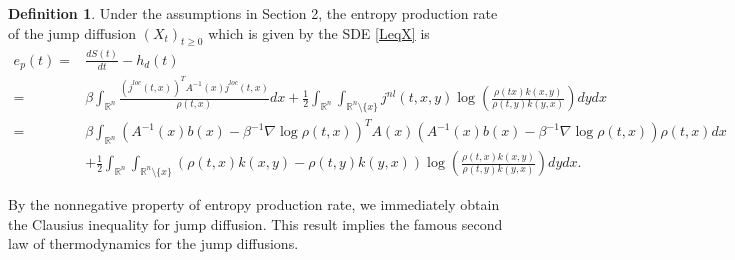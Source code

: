 \documentclass[10pt]{article}
\theoremstyle{definition}
\newtheorem{defn}{Definition}[section]
\theoremstyle{remark}
\numberwithin{equation}{section}
\begin{document}
\begin{defn}
Under the assumptions in Section 2, the entropy production rate of the jump diffusion $(X_t)_{t\geq 0}$ which is given by the SDE \eqref{LeqX} is 
\begin{align}\label{epr}
    e_p(t) = & \frac{d S(t)}{dt} -  h_{d}(t) \nonumber\\
     = & \beta\int_{\mathbb{R}^n}  \frac{(j^{loc}(t,x))^TA^{-1}(x)j^{loc}(t,x)}{\rho(t,x)} dx +\frac{1}{2} \int_{\mathbb{R}^n}\int_{\mathbb{R}^n \setminus \{x\}} j^{nl}(t,x,y)\log \left( \frac{\rho(tx)k(x,y)}{\rho(t,y)k(y,x)} \right) dydx \nonumber\\
     = & \beta\int_{\mathbb{R}^n} (A^{-1}(x)b(x) - \beta^{-1} \nabla \log\rho(t,x))^{T}A(x)(A^{-1}(x)b(x) - \beta^{-1} \nabla \log\rho(t,x)) \rho(t,x)dx \nonumber \\
     &+\frac{1}{2} \int_{\mathbb{R}^n}\int_{\mathbb{R}^n \setminus \{x\}} (\rho(t,x)k(x,y) - \rho(t,y)k(y,x))\log \left( \frac{\rho(t,x)k(x,y)}{\rho(t,y)k(y,x)} \right) dydx.
\end{align}
\end{defn}

By the nonnegative property of entropy production rate, we immediately obtain the Clausius inequality for jump diffusion. This result implies the famous second law of thermodynamics for the jump diffusions. 
\end{document}
